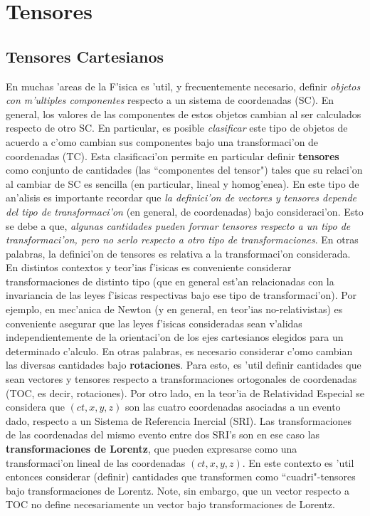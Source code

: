 \chapter{Tensores}
\section{Tensores Cartesianos}

En muchas 'areas de la F'isica es 'util, y frecuentemente necesario, definir \textit{objetos con m'ultiples componentes} respecto a un sistema de coordenadas (SC). En general, los valores de las componentes de estos objetos cambian al ser calculados respecto de otro SC. En particular, es posible \textit{clasificar} este tipo de objetos de acuerdo a c'omo cambian sus componentes bajo una transformaci'on de coordenadas (TC). Esta clasificaci'on permite en particular definir \textbf{tensores} como conjunto de cantidades (las ``componentes del tensor") tales que su relaci'on al cambiar de SC es sencilla (en particular, lineal y homog'enea). En este tipo de an'alisis es importante recordar que \textit{la definici'on de vectores y tensores depende del tipo de transformaci'on} (en general, de coordenadas) bajo consideraci'on. Esto se debe a que, \textit{algunas cantidades pueden formar tensores respecto a un tipo de transformaci'on, pero no serlo respecto a otro tipo de transformaciones}. En otras palabras, la definici'on de tensores es relativa a la transformaci'on considerada. En distintos contextos y teor'ias f'isicas es conveniente considerar transformaciones de distinto tipo (que en general est'an relacionadas con la invariancia de las leyes f'isicas respectivas bajo ese tipo de transformaci'on). Por ejemplo, en mec'anica de Newton (y en general, en teor'ias no-relativistas) es conveniente asegurar que las leyes f'isicas consideradas sean v'alidas independientemente de la orientaci'on de los ejes cartesianos elegidos para un determinado c'alculo. En otras palabras, es necesario considerar c'omo cambian las diversas cantidades bajo \textbf{rotaciones}. Para esto, es 'util definir cantidades que sean vectores y tensores respecto a transformaciones ortogonales de coordenadas (TOC, es decir, rotaciones). Por otro lado, en la teor'ia de Relatividad Especial se considera que $(ct,x,y,z)$ son las cuatro coordenadas asociadas a un evento dado, respecto a un Sistema de Referencia Inercial (SRI). Las transformaciones de las coordenadas del mismo evento entre dos SRI's son en ese caso las \textbf{transformaciones de Lorentz}, que pueden expresarse como una transformaci'on lineal de las coordenadas $(ct,x,y,z)$. En este contexto es 'util entonces considerar (definir) cantidades que transformen como ``cuadri"-tensores bajo transformaciones de Lorentz. Note, sin embargo, que un vector respecto a TOC no define necesariamente un vector bajo transformaciones de Lorentz. 

